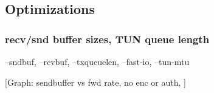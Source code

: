 \documentclass[IN,11pt,twoside,openright,master,english]{tumthesis}
\begin{document}
\subsection{Optimizations}
\subsubsection{recv/snd buffer sizes, TUN queue length}
--sndbuf, --rcvbuf, --txqueuelen, --fast-io, --tun-mtu

[Graph: sendbuffer vs fwd rate, no enc or auth, ]


%


\end{document}
